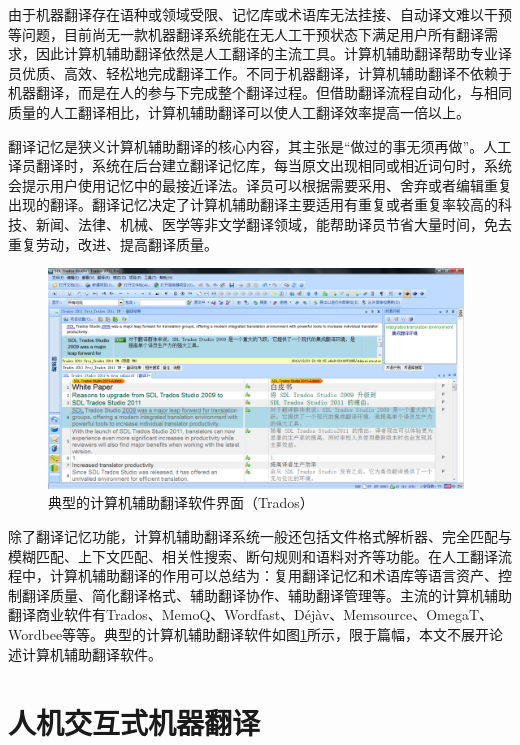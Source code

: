 由于机器翻译存在语种或领域受限、记忆库或术语库无法挂接、自动译文难以干预等问题，目前尚无一款机器翻译系统能在无人工干预状态下满足用户所有翻译需求，因此计算机辅助翻译依然是人工翻译的主流工具。计算机辅助翻译帮助专业译员优质、高效、轻松地完成翻译工作。不同于机器翻译，计算机辅助翻译不依赖于机器翻译，而是在人的参与下完成整个翻译过程。但借助翻译流程自动化，与相同质量的人工翻译相比，计算机辅助翻译可以使人工翻译效率提高一倍以上。

翻译记忆是狭义计算机辅助翻译的核心内容，其主张是“做过的事无须再做”。人工译员翻译时，系统在后台建立翻译记忆库，每当原文出现相同或相近词句时，系统会提示用户使用记忆中的最接近译法。译员可以根据需要采用、舍弃或者编辑重复出现的翻译。翻译记忆决定了计算机辅助翻译主要适用有重复或者重复率较高的科技、新闻、法律、机械、医学等非文学翻译领域，能帮助译员节省大量时间，免去重复劳动，改进、提高翻译质量。

\begin{figure}[tb]
	\centering
	\includegraphics[width=0.98\textwidth]{Figure/Figure_2_7.png}
	\caption{典型的计算机辅助翻译软件界面（Trados）}
	\label{Fig_cat_trados}
\end{figure}

除了翻译记忆功能，计算机辅助翻译系统一般还包括文件格式解析器、完全匹配与模糊匹配、上下文匹配、相关性搜索、断句规则和语料对齐等功能。在人工翻译流程中，计算机辅助翻译的作用可以总结为：复用翻译记忆和术语库等语言资产、控制翻译质量、简化翻译格式、辅助翻译协作、辅助翻译管理等。主流的计算机辅助翻译商业软件有Trados、MemoQ、Wordfast、Déjàv、Memsource、OmegaT、Wordbee等等。典型的计算机辅助翻译软件如图\ref{Fig_cat_trados}所示，限于篇幅，本文不展开论述计算机辅助翻译软件。

\section{人机交互式机器翻译}


